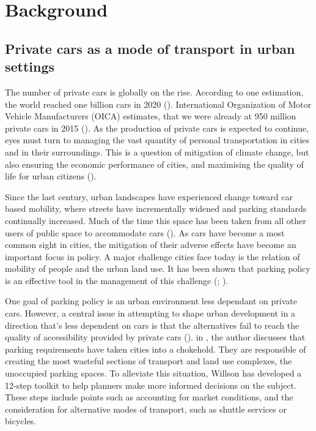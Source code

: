 \section{Background}
\subsection{Private cars as a mode of transport in urban settings}
\justify


The number of private cars is globally on the rise. According to one estimation, the world reached one billion cars in 2020 (\cite{Sperling2009}). International Organization of Motor Vehicle Manufacturers (OICA) estimates, that we were already at 950 million private cars in 2015 (\cite{OICA2020}). As the production of private cars is expected to continue, eyes must turn to managing the vast quantity of personal transportation in cities and in their surroundings. This is a question of mitigation of climate change, but also ensuring the economic performance of cities, and maximising the quality of life for urban citizens (\cite{Bertolini2003}).

Since the last century, urban landscapes have experienced change toward car based mobility, where streets have incrementally widened and parking standards continually increased. Much of the time this space has been taken from all other users of public space to accommodate cars (\cite{Cervero2017}). As cars have become a most common sight in cities, the mitigation of their adverse effects have become an important focus in policy. A major challenge cities face today is the relation of mobility of people and the urban land use. It has been shown that parking policy is an effective tool in the management of this challenge (\cite{Diallo2015}; \cite{Marsden2006}).

One goal of parking policy is an urban environment less dependant on private cars. However, a central issue in attempting to shape urban development in a direction that's less dependent on cars is that the alternatives fail to reach the quality of accessibility provided by private cars (\cite{Bertolini2003}). in , the author discusses that parking requirements have taken cities into a chokehold. They are responsible of creating the most wasteful sections of transport and land use complexes, the unoccupied parking spaces. To alleviate this situation, Willson has developed a 12-step toolkit to help planners make more informed decisions on the subject. These steps include points such as accounting for market conditions, and the consideration for alternative modes of transport, such as shuttle services or bicycles.

